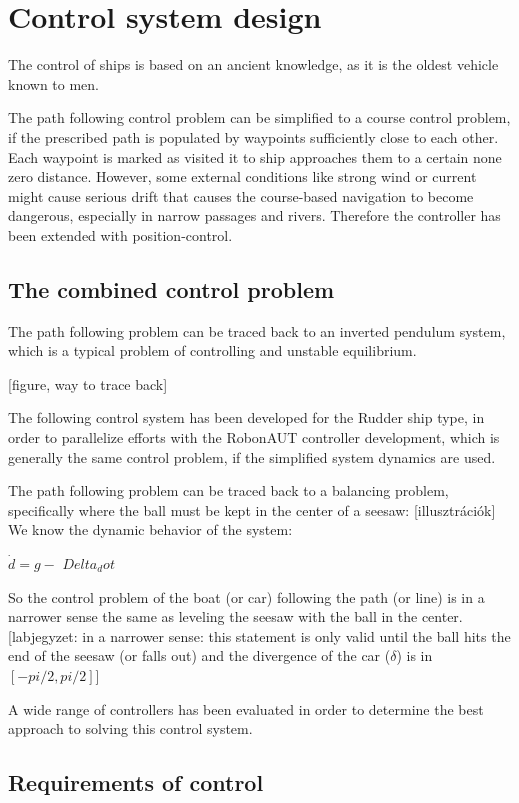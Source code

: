 \section{Control system design}

The control of ships is based on an ancient knowledge, as it is the oldest vehicle known to men.

The path following control problem can be simplified to a course control problem, if the prescribed path is populated by waypoints sufficiently close to each other. Each waypoint is marked as visited it to ship approaches them to a certain none zero distance. However, some external conditions like strong wind or current might cause serious drift that causes the course-based navigation to become dangerous, especially in narrow passages and rivers. Therefore the controller has been extended with position-control.

\subsection{The combined control problem}

The path following problem can be traced back to an inverted pendulum system, which is a typical problem of controlling and unstable equilibrium. 

[figure, way to trace back]

The following control system has been developed for the Rudder ship type, in order to parallelize efforts with the RobonAUT controller development, which is generally the same control problem, if the simplified system dynamics are used.

The path following problem can be traced back to a balancing problem, specifically where the ball must be kept in the center of a seesaw: [illusztrációk]
We know the dynamic behavior of the system:

$\dot{d} = g-$
$Delta_dot$

So the control problem of the boat (or car) following the path (or line) is in a narrower sense the same as leveling the seesaw with the ball in the center. [labjegyzet: in a narrower sense: this statement is only valid until the ball hits the end of the seesaw (or falls out) and the divergence of the car ($\delta$) is in $[-pi/2, pi/2]$]

A wide range of controllers has been evaluated in order to determine the best approach to solving this control system.

\subsection{Requirements of control}

